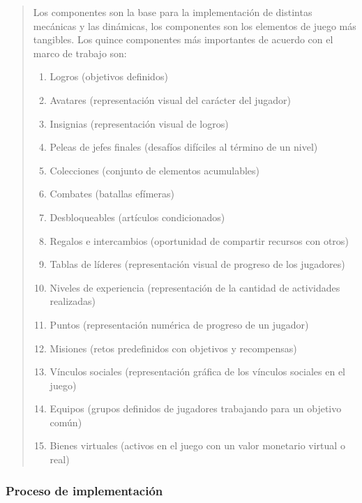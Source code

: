  \begin{quote}
    Los componentes son la base para la implementación de distintas mecánicas y las dinámicas,
    los componentes son los elementos de juego más tangibles. Los quince componentes más importantes
    de acuerdo con el marco de trabajo son:

    \begin{enumerate}
        \item Logros (objetivos definidos)
        \item Avatares (representación visual del carácter del jugador)
        \item Insignias (representación visual de logros)
        \item Peleas de jefes finales (desafíos difíciles al término de un nivel)
        \item Colecciones (conjunto de elementos acumulables)
        \item Combates (batallas efímeras)
        \item Desbloqueables (artículos condicionados)
        \item Regalos e intercambios (oportunidad de compartir recursos con otros)
        \item Tablas de líderes (representación visual de progreso de los jugadores)
        \item Niveles de experiencia (representación de la cantidad de actividades
              realizadas)
        \item Puntos (representación numérica de progreso de un jugador)
        \item Misiones (retos predefinidos con objetivos y recompensas)
        \item Vínculos sociales (representación gráfica de los vínculos sociales en
              el juego)
        \item Equipos (grupos definidos de jugadores trabajando para un objetivo común)
        \item Bienes virtuales (activos en el juego con un valor monetario virtual o
              real)
    \end{enumerate}
 \end{quote}


\subsubsection{Proceso de implementación}

